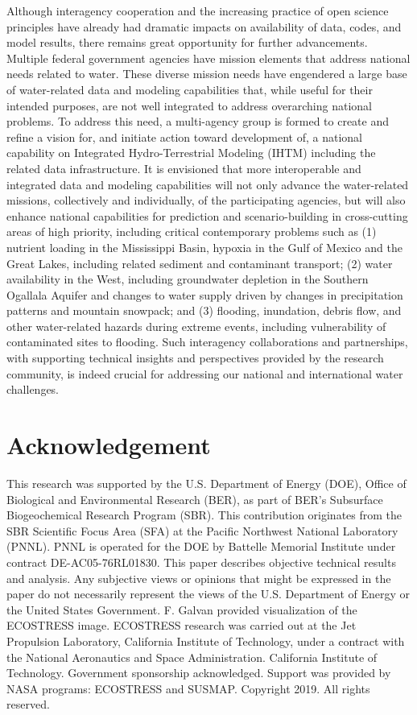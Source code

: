 \documentclass[preprint,review, 12pt]{elsarticle}
\begin{document}
Although interagency cooperation and the increasing practice of open science principles have already had dramatic impacts on availability of data, codes, and model results, there remains great opportunity for further advancements. Multiple federal government agencies have mission elements that address national needs related to water. These diverse mission needs have engendered a large base of water-related data and modeling capabilities that, while useful for their intended purposes, are not well integrated to address overarching national problems. To address this need, a multi-agency group is formed to create and refine a vision for, and initiate action toward development of, a national capability on Integrated Hydro-Terrestrial Modeling (IHTM) including the related data infrastructure. It is envisioned that more interoperable and integrated data and modeling capabilities will not only advance the water-related missions, collectively and individually, of the participating agencies, but will also enhance national capabilities for prediction and scenario-building in cross-cutting areas of high priority, including critical contemporary problems such as (1) nutrient loading in the Mississippi Basin, hypoxia in the Gulf of Mexico and the Great Lakes, including related sediment and contaminant transport; (2) water availability in the West, including groundwater depletion in the Southern Ogallala Aquifer and changes to water supply driven by changes in precipitation patterns and mountain snowpack; and (3) flooding, inundation, debris flow, and other water-related hazards during extreme events, including vulnerability of contaminated sites to flooding. Such interagency collaborations and partnerships, with supporting technical insights and perspectives provided by the research community, is indeed crucial for addressing our national and international water challenges. 
 
 
    
\section{Acknowledgement}
This research was supported by the U.S. Department of Energy (DOE), Office of Biological and Environmental Research (BER), as part of BER's Subsurface Biogeochemical Research Program (SBR). This contribution originates from the SBR Scientific Focus Area (SFA) at the Pacific Northwest National Laboratory (PNNL). PNNL is operated for the DOE by Battelle Memorial Institute under contract DE-AC05-76RL01830. This paper describes objective technical results and analysis. Any subjective views or opinions that might be expressed in the paper do not necessarily represent the views of the U.S. Department of Energy or the United States Government. F. Galvan provided visualization of the ECOSTRESS image. ECOSTRESS research was carried out at the Jet Propulsion Laboratory, California Institute of Technology, under a contract with the National Aeronautics and Space Administration. California Institute of Technology. Government sponsorship acknowledged. Support was provided by NASA programs: ECOSTRESS and SUSMAP. Copyright 2019. All rights reserved.
\end{document}
